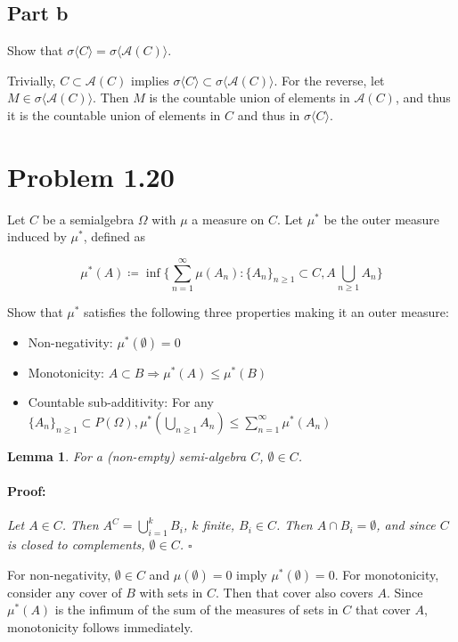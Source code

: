 \documentclass{article}
\newenvironment{proof}{\paragraph{Proof:}}{\hfill$\square$}
\newtheorem{lemma}[theorem]{Lemma}
\begin{document}
\subsection*{Part b}

Show that $\sigma\langle C\rangle = \sigma\langle \mathcal{A}(C) \rangle$.

Trivially, $C \subset \mathcal{A}(C)$ implies $\sigma\langle C\rangle \subset \sigma\langle \mathcal{A}(C) \rangle$. For the reverse, let $M \in \sigma\langle \mathcal{A}(C) \rangle$. Then $M$ is the countable union of elements in $\mathcal{A}(C)$, and thus it is the countable union of elements in $C$ and thus in $\sigma\langle C\rangle$.

\section*{Problem 1.20}

Let $C$ be a semialgebra $\Omega$ with $\mu$ a measure on $C$. Let $\mu^*$ be the outer measure induced by $\mu^*$, defined as

\[
\mu^*(A) \coloneq \inf\Biggl\{
\sum_{n=1}^\infty \mu(A_n):\{A_n\}_{n\geq 1} \subset C, A \bigcup_{n\geq 1} A_n
\Biggr\}
\]

Show that $\mu^*$ satisfies the following three properties making it an outer measure:
\begin{itemize}
\item Non-negativity: $\mu^*(\emptyset) = 0$
\item Monotonicity: $A \subset B \Rightarrow \mu^*(A) \leq \mu^*(B)$
\item Countable sub-additivity: For any $\{A_n\}_{n \geq 1} \subset P(\Omega), \mu^*\left( \bigcup_{n\geq 1} A_n \right) \leq \sum_{n=1}^\infty \mu^*(A_n)$
\end{itemize}

\begin{lemma}
For a (non-empty) semi-algebra $C$, $\emptyset \in C$.
\begin{proof}
Let $A \in C$. Then $A^C = \bigcup_{i=1}^k B_i$, $k$ finite, $B_i \in C$. Then $A \cap B_i = \emptyset$, and since $C$ is closed to complements, $\emptyset \in C$.
\end{proof}
\end{lemma}

For non-negativity, $\emptyset \in C$ and $\mu(\emptyset) = 0$ imply $\mu^*(\emptyset) = 0$. For monotonicity, consider any cover of $B$ with sets in $C$. Then that cover also covers $A$. Since $\mu^*(A)$ is the infimum of the sum of the measures of sets in $C$ that cover $A$, monotonicity follows immediately.
\end{document}
